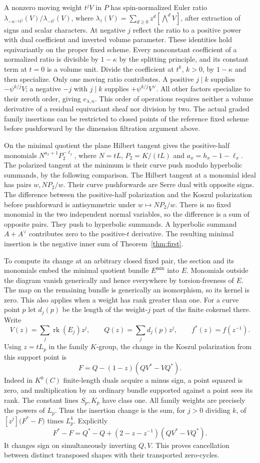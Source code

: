 A nonzero moving weight $t^j V$ in $P$ has spin-normalized Euler ratio $\lambda_{-\kappa^{-1} t^j}(V)/\lambda_{-t^j}(V)$, where $\lambda_z(V)=\sum_{d\ge0}z^d[\bigwedge^dV]$, after extraction of signs and scalar characters. At negative $j$ reflect the ratio to a positive power with dual coefficient and inverted volume parameter. These identities hold equivariantly on the proper fixed scheme. Every nonconstant coefficient of a normalized ratio is divisible by $1-\kappa$ by the splitting principle, and its constant term at $t=0$ is a volume unit. Divide the coefficient at $t^k$, $k>0$, by $1-\kappa$ and then specialize. Only one moving ratio contributes. A positive $j\mid k$ supplies $-\psi^{k/j} V$; a negative $-j$ with $j\mid k$ supplies $+\psi^{k/j} V^\vee$. All other factors specialize to their zeroth order, giving $e_{\lambda,n}$. This order of operations requires neither a volume derivative of a residual equivariant sheaf nor division by two. The actual graded family insertions can be restricted to closed points of the reference fixed scheme before pushforward by the dimension filtration argument above.

On the minimal quotient the plane Hilbert tangent gives the positive-half monomials $N^{a_x+1}P_2^{-\ell_x}$, where $N=tL$, $P_2=K/(tL)$ and $a_x=h_x-1-\ell_x$. The polarized tangent at the minimum is their curve push modulo hyperbolic summands, by the following comparison. The Hilbert tangent at a monomial ideal has pairs $w,NP_2/w$. Their curve pushforwards are Serre dual with opposite signs. The difference between the positive-half polarization and the Koszul polarization before pushforward is antisymmetric under $w\mapsto NP_2/w$. There is no fixed monomial in the two independent normal variables, so the difference is a sum of opposite pairs. They push to hyperbolic summands. A hyperbolic summand $A+A^\vee$ contributes zero to the positive-$t$ derivative. The resulting minimal insertion is the negative inner sum of Theorem~\ref{thm:first}.

To compute its change at an arbitrary closed fixed pair, the section and its monomials embed the minimal quotient bundle $E^{\min}$ into $E$. Monomials outside the diagram vanish generically and hence everywhere by torsion-freeness of $E$. The map on the remaining bundle is generically an isomorphism, so its kernel is zero. This also applies when a weight has rank greater than one. For a curve point $p$ let $d_j(p)$ be the length of the weight-$j$ part of the finite cokernel there. Write
\[
V(z)=\sum_j\operatorname{rk}(E_j)z^j,\qquad Q(z)=\sum_j d_j(p)z^j,\qquad f^*(z)=f(z^{-1}).
\]
Using $z=tL_p$ in the family $K$-group, the change in the Koszul polarization from this support point is
\[
F=Q-(1-z)(QV^*-VQ^*).
\]
Indeed in $K^0(C)$ finite-length duals acquire a minus sign, a point squared is zero, and multiplication by an ordinary bundle supported against a point sees its rank. The constant lines $S_p,K_p$ have class one. All family weights are precisely the powers of $L_p$. Thus the insertion change is the sum, for $j>0$ dividing $k$, of $[z^j]\bigl(F^*-F\bigr)$ times $L_p^k$. Explicitly
\[
F^*-F=Q^*-Q+(2-z-z^{-1})(QV^*-VQ^*).
\]
It changes sign on simultaneously inverting $Q,V$. This proves cancellation between distinct transposed shapes with their transported zero-cycles.

